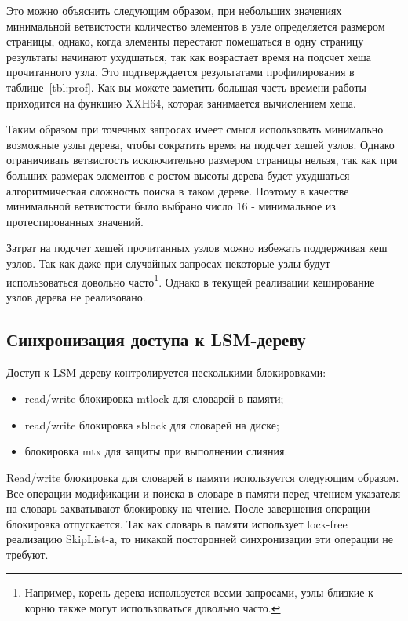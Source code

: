 Это можно объяснить следующим образом, при небольших значениях минимальной
ветвистости количество элементов в узле определяется размером страницы, однако,
когда элементы перестают помещаться в одну страницу результаты начинают
ухудшаться, так как возрастает время на подсчет хеша прочитанного узла. Это
подтверждается результатами профилирования в таблице~\ref{tbl:prof}. Как вы
можете заметить большая часть времени работы приходится на функцию XXH64,
которая занимается вычислением хеша.

Таким образом при точечных запросах имеет смысл использовать минимально
возможные узлы дерева, чтобы сократить время на подсчет хешей узлов. Однако
ограничивать ветвистость исключительно размером страницы нельзя, так как при
больших размерах элементов с ростом высоты дерева будет ухудшаться
алгоритмическая сложность поиска в таком дереве. Поэтому в качестве минимальной
ветвистости было выбрано число 16 - минимальное из протестированных значений.

Затрат на подсчет хешей прочитанных узлов можно избежать поддерживая кеш узлов.
Так как даже при случайных запросах некоторые узлы будут использоваться довольно
часто\footnote{Например, корень дерева используется всеми запросами, узлы
близкие к корню также могут использоваться довольно часто.}. Однако в текущей
реализации кеширование узлов дерева не реализовано.


\subsection{Синхронизация доступа к LSM-дереву}

Доступ к LSM-дереву контролируется несколькими блокировками:
\begin{itemize}
  \item read/write блокировка mtlock для словарей в памяти;
  \item read/write блокировка sblock для словарей на диске;
  \item блокировка mtx для защиты при выполнении слияния.
\end{itemize}

Read/write блокировка для словарей в памяти используется следующим образом. Все
операции модификации и поиска в словаре в памяти перед чтением указателя на
словарь захватывают блокировку на чтение. После завершения операции блокировка
отпускается. Так как словарь в памяти использует lock-free реализацию
SkipList-а, то никакой посторонней синхронизации эти операции не требуют.


